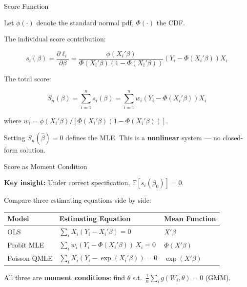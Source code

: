 \documentclass[aspectratio=169, handout, t]{beamer}
\numberwithin{equation}{section}
\begin{document}

\begin{frame}{Score Function}

Let $\phi(\cdot)$ denote the standard normal pdf, $\Phi(\cdot)$ the CDF.

\pause

The individual score contribution:

\[
s_i(\beta) = \frac{\partial \ell_i}{\partial \beta}
=
\frac{\phi(X_i'\beta)}{\Phi(X_i'\beta)(1-\Phi(X_i'\beta))}
\left(Y_i - \Phi(X_i'\beta)\right) X_i
\]

\pause

The total score:

\[
S_n(\beta) = \sum_{i=1}^n s_i(\beta) = \sum_{i=1}^n w_i \left(Y_i - \Phi(X_i'\beta)\right) X_i
\]

where $w_i = \phi(X_i'\beta)/[\Phi(X_i'\beta)(1-\Phi(X_i'\beta))]$.

\pause

\bigskip

Setting $S_n(\hat\beta) = 0$ defines the MLE. This is a \textbf{nonlinear} system --- no closed-form solution.

\end{frame}


\begin{frame}{Score as Moment Condition}

\textbf{Key insight:} Under correct specification, $\mathbb{E}[s_i(\beta_0)] = 0$.

\pause

\bigskip

Compare three estimating equations side by side:

\medskip

\renewcommand{\arraystretch}{1.8}
\begin{tabular}{lll}
\toprule
\textbf{Model} & \textbf{Estimating Equation} & \textbf{Mean Function} \\
\midrule
OLS & $\displaystyle\sum_i X_i(Y_i - X_i'\beta) = 0$ & $X'\beta$ \\[6pt]
Probit MLE & $\displaystyle\sum_i w_i(Y_i - \Phi(X_i'\beta))\, X_i = 0$ & $\Phi(X'\beta)$ \\[6pt]
Poisson QMLE & $\displaystyle\sum_i X_i(Y_i - \exp(X_i'\beta)) = 0$ & $\exp(X'\beta)$ \\[6pt]
\bottomrule
\end{tabular}
\renewcommand{\arraystretch}{1.0}

\pause

\smallskip

All three are \textbf{moment conditions}: find $\theta$ s.t.\ $\frac{1}{n}\sum_i g(W_i, \theta) = 0$ (GMM).

\end{frame}
\end{document}
